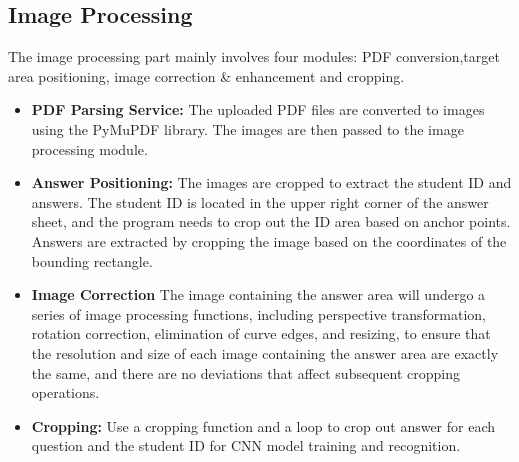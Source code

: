 \documentclass[twocolumn]{article}
\begin{document}
    \subsection{Image Processing}
    The image processing part mainly involves four modules: PDF conversion,target area positioning, image correction \& enhancement and cropping.
    \begin{itemize}
        \item \textbf{PDF Parsing Service:} The uploaded PDF files are converted to images using the PyMuPDF library. The images are then passed to the image processing module.
        \item \textbf{Answer Positioning:} The images are cropped to extract the student ID and answers. The student ID is located in the upper right corner of the answer sheet, and the program needs to crop out the ID area based on anchor points. Answers are extracted by cropping the image based on the coordinates of the bounding rectangle.
        \item \textbf{Image Correction} The image containing the answer area will undergo a series of image processing functions, including perspective transformation, rotation correction, elimination of curve edges, and resizing, to ensure that the resolution and size of each image containing the answer area are exactly the same, and there are no deviations that affect subsequent cropping operations.
        \item \textbf{Cropping:} Use a cropping function and a loop to crop out answer for each question and the student ID for CNN model training and recognition. 
    \end{itemize}
\end{document}
